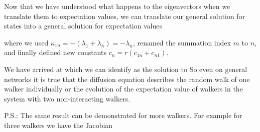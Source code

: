 Now that we have understood what happens to the eigenvectors when we translate them to expectation values, we can translate our general solution for states into a general solution for expectation values 

where we used $\kappa_{1n}=-(\lambda_1+\lambda_n)=-\lambda_n$, renamed the summation index $m$ to $n$, and finally defined new constants $c_n=r(c_{1n}+c_{n1})$. 

We have arrived  at 
which we can identify as the solution to 
So even on general networks it is true that the diffusion equation describes the random walk of one walker individually or the evolution of the expectation value of walkers in the system with two non-interacting walkers. 

P.S.: The same result can be demonstrated for more walkers. For example for three walkers we have the Jacobian

